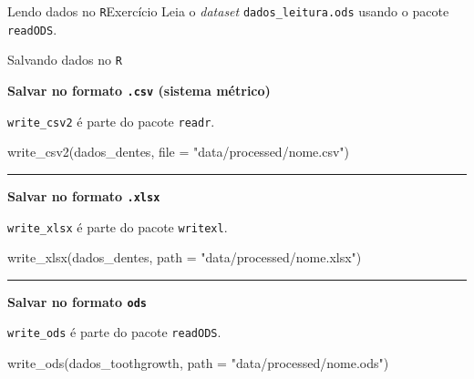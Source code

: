 \documentclass[
  10pt,
  ignorenonframetext,
]{beamer}
\newenvironment{Shaded}{}{}
\newcommand{\DataTypeTok}[1]{#1}
\newcommand{\KeywordTok}[1]{\textcolor[rgb]{0.00,0.00,1.00}{#1}}
\newcommand{\NormalTok}[1]{#1}
\newcommand{\StringTok}[1]{\textcolor[rgb]{0.00,0.50,0.50}{#1}}
\begin{document}
\begin{frame}[fragile]{Lendo dados no \texttt{R}\newline Exercício}
\protect\hypertarget{lendo-dados-no-rexercuxedcio-2}{}
Leia o \emph{dataset} \texttt{dados\_leitura.ods} usando o pacote
\texttt{readODS}.
\end{frame}

\begin{frame}[fragile]{Salvando dados no \texttt{R}}
\protect\hypertarget{salvando-dados-no-r}{}
\small

\textbf{Salvar no formato \texttt{.csv} (sistema métrico)}

\texttt{write\_csv2} é parte do pacote \texttt{readr}.

\begin{Shaded}
\begin{Highlighting}[]
\KeywordTok{write\_csv2}\NormalTok{(dados\_dentes, }\DataTypeTok{file =} \StringTok{"data/processed/nome.csv"}\NormalTok{)}
\end{Highlighting}
\end{Shaded}

\rule{\textwidth}{0.5pt}

\textbf{Salvar no formato \texttt{.xlsx} }

\texttt{write\_xlsx} é parte do pacote \texttt{writexl}.

\begin{Shaded}
\begin{Highlighting}[]
\KeywordTok{write\_xlsx}\NormalTok{(dados\_dentes, }\DataTypeTok{path =} \StringTok{"data/processed/nome.xlsx"}\NormalTok{)}
\end{Highlighting}
\end{Shaded}

\rule{\textwidth}{0.5pt}

\textbf{Salvar no formato \texttt{ods}}

\texttt{write\_ods} é parte do pacote \texttt{readODS}.

\begin{Shaded}
\begin{Highlighting}[]
\KeywordTok{write\_ods}\NormalTok{(dados\_toothgrowth, }\DataTypeTok{path =} \StringTok{"data/processed/nome.ods"}\NormalTok{)}
\end{Highlighting}
\end{Shaded}

\normalsize
\end{frame}
\end{document}
